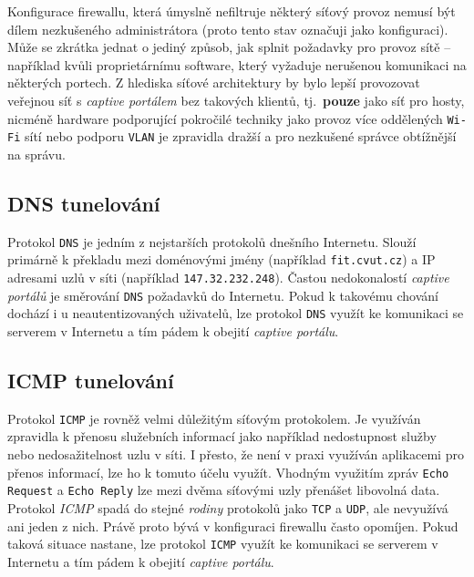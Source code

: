 \documentclass[thesis=M,czech]{FITthesis}[2012/10/20]
\begin{document}
Konfigurace firewallu, která úmyslně nefiltruje některý síťový provoz nemusí být dílem nezkušeného administrátora (proto tento stav označuji jako \textbf{} konfiguraci). Může se zkrátka jednat o jediný způsob, jak splnit požadavky pro provoz sítě -- například kvůli proprietárnímu software, který vyžaduje nerušenou komunikaci na některých portech. Z hlediska síťové architektury by bylo lepší provozovat veřejnou síť s \textit{captive portálem} bez takových klientů, tj.~\textbf{pouze} jako síť pro hosty, nicméně hardware podporující pokročilé techniky jako provoz více oddělených \texttt{Wi-Fi} sítí nebo podporu \texttt{VLAN} je zpravidla dražší a pro nezkušené správce obtížnější na správu.


\subsection{DNS tunelování}
\label{subsec:dns-tunel-intro}

Protokol \texttt{DNS} je jedním z nejstarších protokolů dnešního Internetu. Slouží primárně k překladu mezi doménovými jmény (například \texttt{fit.cvut.cz}) a IP adresami uzlů v síti (například \texttt{147.32.232.248}). Častou nedokonalostí \textit{captive portálů} je směrování \texttt{DNS} požadavků do Internetu. Pokud k takovému chování dochází i u neautentizovaných uživatelů, lze protokol \texttt{DNS} využít ke komunikaci se serverem v Internetu a tím pádem k obejití \textit{captive portálu}.



\subsection{ICMP tunelování}

Protokol \texttt{ICMP} je rovněž velmi důležitým síťovým protokolem. Je využíván zpravidla k přenosu služebních informací jako například nedostupnost služby nebo nedosažitelnost uzlu v síti. I přesto, že není v praxi využíván aplikacemi pro přenos informací, lze ho k tomuto účelu využít. Vhodným využitím zpráv \texttt{Echo Request} a \texttt{Echo Reply} lze mezi dvěma síťovými uzly přenášet libovolná data. Protokol \textit{ICMP} spadá do stejné \textit{rodiny} protokolů jako \texttt{TCP} a \texttt{UDP}, ale nevyužívá ani jeden z nich. Právě proto bývá v konfiguraci firewallu často opomíjen. Pokud taková situace nastane, lze protokol \texttt{ICMP} využít ke komunikaci se serverem v Internetu a tím pádem k obejití \textit{captive portálu}.
\end{document}
